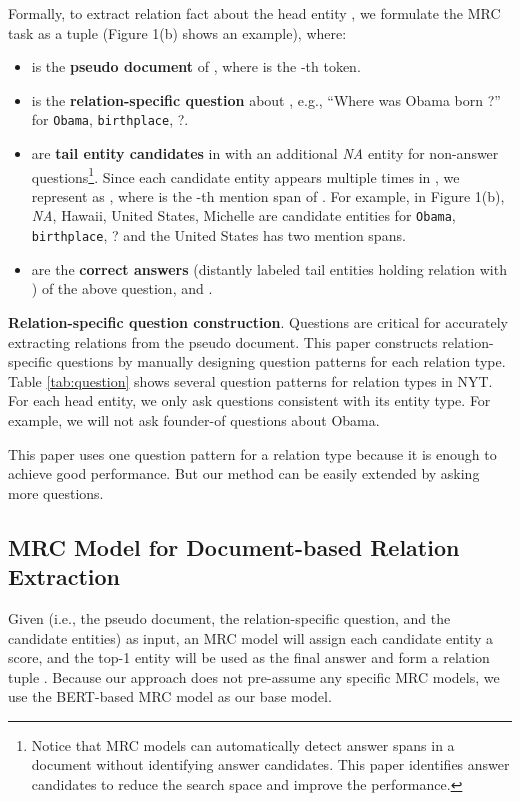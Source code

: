 \documentclass[11pt,a4paper]{article}
\begin{document}
  Formally, to extract relation fact  about the head entity , we formulate the MRC task as a tuple  (Figure 1(b) shows an example), where:
  \begin{itemize}
    \setlength{\itemsep}{0pt}
    \setlength{\parsep}{0pt}
    \setlength{\parskip}{0pt}
    \item  is the \textbf{pseudo document} of , where  is the -th token.
    \item  is the \textbf{relation-specific question} about , e.g., ``Where was Obama born ?'' for \texttt{Obama}, \texttt{birthplace}, ?.
    \item  are \textbf{tail entity candidates} in  with an additional \emph{NA} entity for non-answer questions\footnote{Notice that MRC models can automatically detect answer spans in a document without identifying answer candidates. This paper identifies answer candidates to reduce the search space and improve the performance.}.
    Since each candidate entity appears multiple times in , we represent  as , where  is the -th mention span of . For example, in Figure 1(b), \emph{NA}, Hawaii, United States, Michelle are candidate entities for \texttt{Obama}, \texttt{birthplace}, ? and the United States has two mention spans.
    \item  are the \textbf{correct answers} (distantly labeled tail entities holding relation  with ) of the above question, and .
  \end{itemize}
  
  \textbf{Relation-specific question construction}.
  Questions are critical for accurately extracting relations from the pseudo document.
  This paper constructs relation-specific questions by manually designing question patterns for each relation type.
  Table \ref{tab:question} shows several question patterns for relation types in NYT.
  For each head entity, we only ask questions consistent with its entity type. For example, we will not ask founder-of questions about Obama. 
  
  This paper uses one question pattern for a relation type because it is enough to achieve good performance. But our method can be easily extended by asking more questions.
  
  \subsection{MRC Model for Document-based Relation Extraction}
  Given  (i.e., the pseudo document, the relation-specific question, and the candidate entities) as input, an MRC model will assign each candidate entity a score, and the top-1 entity  will be used as the final answer and form a relation tuple .
  Because our approach does not pre-assume any specific MRC models,
  we use the BERT-based MRC model \cite{devlin_bert_2019} as our base model.
  
\end{document}
